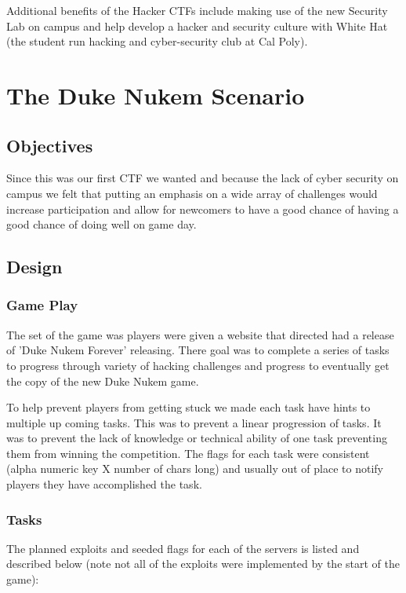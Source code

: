 \documentclass[10pt]{article}
\begin{document}
Additional benefits of the Hacker CTFs include making use of the new Security
Lab on campus and help develop a hacker and security culture with White Hat
(the student run hacking and cyber-security club at Cal Poly).


\section{The Duke Nukem Scenario}
\subsection{Objectives}
Since this was our first CTF we wanted and because the lack of cyber security
on campus we felt that putting an emphasis on a wide array of challenges
would increase participation and allow for newcomers to have a good chance of 
having a good chance of doing well on game day.



\subsection{Design}
\subsubsection{Game Play}
The set of the game was players were given a website that directed had a release of
'Duke Nukem Forever' releasing. There goal was to complete a series of tasks
to progress through variety of hacking challenges and progress to eventually get
the copy of the new Duke Nukem game.

To help prevent players from getting stuck we made each task have hints to multiple
up coming tasks. This was to prevent a linear progression of tasks. It was to prevent
the lack of knowledge or technical ability of one task preventing them from winning
the competition. The flags for each task were consistent (alpha numeric key X number
of chars long) and usually out of place to notify players they have accomplished
the task.

\subsubsection{Tasks}
The planned exploits and seeded flags for each of the servers is listed and
described below (note not all of the exploits were implemented by the start of
the game):
\end{document}
